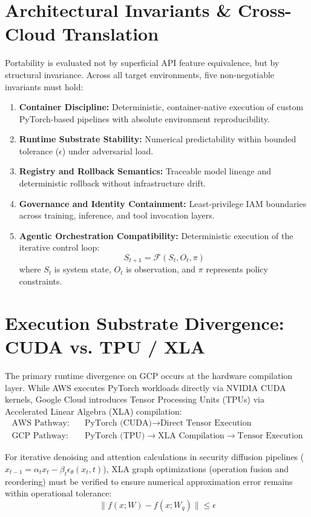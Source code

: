 \documentclass[10pt,a4paper]{article}
\begin{document}
\section{Architectural Invariants & Cross-Cloud Translation}
Portability is evaluated not by superficial API feature equivalence, but by structural invariance. Across all target environments, five non-negotiable invariants must hold:
\begin{enumerate}[leftmargin=1.5em, itemsep=0.2em]
  \item \textbf{Container Discipline:} Deterministic, container-native execution of custom PyTorch-based pipelines with absolute environment reproducibility.
  \item \textbf{Runtime Substrate Stability:} Numerical predictability within bounded tolerance ($\epsilon$) under adversarial load.
  \item \textbf{Registry and Rollback Semantics:} Traceable model lineage and deterministic rollback without infrastructure drift.
  \item \textbf{Governance and Identity Containment:} Least-privilege IAM boundaries across training, inference, and tool invocation layers.
  \item \textbf{Agentic Orchestration Compatibility:} Deterministic execution of the iterative control loop:
  \begin{equation}
    S_{t+1} = \mathcal{F}(S_t, O_t, \pi)
  \end{equation}
  where $S_t$ is system state, $O_t$ is observation, and $\pi$ represents policy constraints.
\end{enumerate}

\section{Execution Substrate Divergence: CUDA vs. TPU / XLA}
The primary runtime divergence on GCP occurs at the hardware compilation layer. While AWS executes PyTorch workloads directly via NVIDIA CUDA kernels, Google Cloud introduces Tensor Processing Units (TPUs) via Accelerated Linear Algebra (XLA) compilation:
\begin{align*}
  \text{AWS Pathway:} \quad &\text{PyTorch (CUDA)} \rightarrow \text{Direct Tensor Execution} \\
  \text{GCP Pathway:} \quad &\text{PyTorch (TPU)} \rightarrow \text{XLA Compilation} \rightarrow \text{Tensor Execution}
\end{align*}

For iterative denoising and attention calculations in security diffusion pipelines ($x_{t-1} = \alpha_t x_t - \beta_t \epsilon_\theta(x_t, t)$), XLA graph optimizations (operation fusion and reordering) must be verified to ensure numerical approximation error remains within operational tolerance:
\begin{equation}
  \| f(x; W) - f(x; W_q) \| \le \epsilon
\end{equation}
\end{document}
